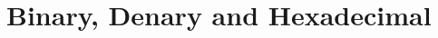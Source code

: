 \documentclass[../main.tex]{subfiles}
\begin{document}
\newpage
\section{Binary, Denary and Hexadecimal}

\end{document}
